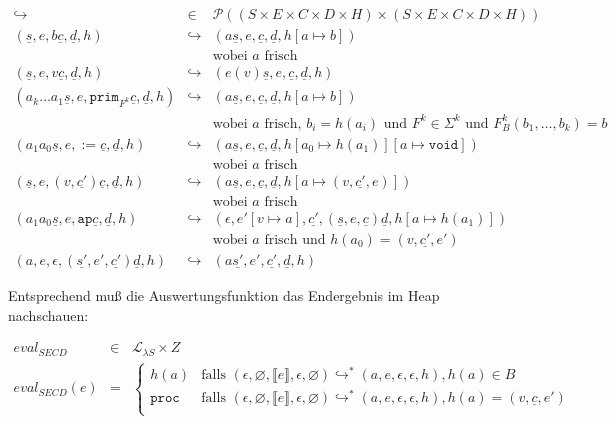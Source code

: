 \begin{eqnarray*}
  \hookrightarrow &\in& \mathcal{P}((S\times E\times C\times D\times H) \times (S\times E\times C\times D\times H))\\
  (\underline{s}, e, b\underline{c}, \underline{d}, h)
  &\hookrightarrow& 
  (a\underline{s}, e, \underline{c}, \underline{d}, h[a \mapsto b] )
  \\ && \textrm{wobei $a$ frisch}
  \\
  (\underline{s}, e, v\underline{c}, \underline{d}, h)
  &\hookrightarrow&
  (e(v)\underline{s}, e, \underline{c}, \underline{d}, h)
  \\
  (a_k\ldots a_1\underline{s}, e, \mathtt{prim}_{F^k}\underline{c},
  \underline{d}, h)
  &\hookrightarrow&
  (a\underline{s}, e, \underline{c}, \underline{d}, h[a\mapsto b] )
  \\ && \textrm{wobei $a$ frisch, $b_i = h(a_i)$ und $F^k\in\Sigma^k$ und $F^k_B(b_1,\ldots,b_k) = b$}
  \\
  (a_1a_0\underline{s}, e, \mathtt{:=} \underline{c}, \underline{d}, h)
  &\hookrightarrow&
  (a\underline{s}, e, \underline{c}, \underline{d}, h[a_0 \mapsto
  h(a_1)][a\mapsto \mathtt{void}] )
  \\ && \textrm{wobei $a$ frisch}
  \\
  (\underline{s}, e, (v, \underline{c'})\underline{c}, \underline{d},
  h)
  &\hookrightarrow&
  (a\underline{s}, e, \underline{c}, \underline{d}, h[a \mapsto (v,
  \underline{c'}, e)] )
  \\ && \textrm{wobei $a$ frisch}
  \\
  (a_1a_0\underline{s}, e, \mathtt{ap}\underline{c}, \underline{d}, h)
  &\hookrightarrow&
  (\epsilon, e'[v\mapsto a], \underline{c'}, (\underline{s}, e,
  \underline{c}) \underline{d}, h[a\mapsto h(a_1)])
  \\ && \textrm{wobei $a$ frisch und $h(a_0) = (v, \underline{c'}, e')$}
  \\
  (a, e, \epsilon, (\underline{s'}, e', \underline{c'}) \underline{d}, h)
  &\hookrightarrow&
  (a\underline{s'}, e', \underline{c'}, \underline{d}, h)
\end{eqnarray*}

Entsprechend muß die Auswertungsfunktion das Endergebnis im Heap nachschauen:

\begin{eqnarray*}
  \mathit{eval}_\mathit{SECD} & \in & \mathcal{L}_{\lambda{}S} \times Z\\
  \mathit{eval}_\mathit{SECD}(e) & = &
  \begin{cases}
    h(a) & \textrm{falls } (\epsilon, \varnothing, \llbracket
    e\rrbracket, \epsilon, \varnothing)
    \hookrightarrow^* (a, e, \epsilon, \epsilon, h), h(a) \in B\\
    \texttt{proc} & \textrm{falls } (\epsilon, \varnothing, \llbracket e\rrbracket, \epsilon,\varnothing)
    \hookrightarrow^* (a, e, \epsilon, \epsilon, h), h(a) = (v, \underline{c}, e')\\
  \end{cases}
\end{eqnarray*}



